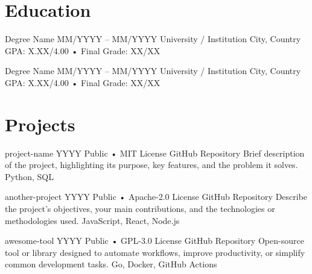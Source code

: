 \documentclass[a4paper,9pt]{extarticle}
\begin{document}
\resumeSubHeadingListEnd


\section{Education}

\resumeSubHeadingListStart

\resumeSubheadingEdu
{Degree Name}
{MM/YYYY -- MM/YYYY}
{University / Institution}
{City, Country}
{GPA: X.XX/4.00 • Final Grade: XX/XX}
\resumeItemListStart
{}
\resumeItemListEnd

\resumeSubheadingEdu
{Degree Name}
{MM/YYYY -- MM/YYYY}
{University / Institution}
{City, Country}
{GPA: X.XX/4.00 • Final Grade: XX/XX}
\resumeItemListStart
{}
\resumeItemListEnd

\resumeSubHeadingListEnd


\section{Projects}

\resumeSubHeadingListStart

\resumeProject
{project-name}
{YYYY}
{Public • MIT License}
{GitHub Repository}
{Brief description of the project, highlighting its purpose, key features, and the problem it solves.}
{Python, SQL}

\resumeProject
{another-project}
{YYYY}
{Public • Apache-2.0 License}
{GitHub Repository}
{Describe the project's objectives, your main contributions, and the technologies or methodologies used.}
{JavaScript, React, Node.js}

\resumeProject
{awesome-tool}
{YYYY}
{Public • GPL-3.0 License}
{GitHub Repository}
{Open-source tool or library designed to automate workflows, improve productivity, or simplify common development tasks.}
{Go, Docker, GitHub Actions}
\end{document}
